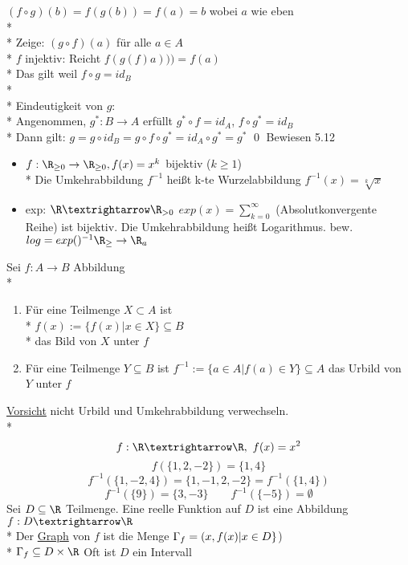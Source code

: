$(f\circ g)(b)=f(g(b))=f(a)=b$ wobei $a$ wie eben\\* \\*
%
Zeige: $(g \circ f) (a) $ für alle $a \in A$\\*
$f$ injektiv: Reicht $f(g(f)a))) = f(a)$\\*
Das gilt weil $f \circ g = id_B$ \ok \\* \\*
Eindeutigkeit von $g$:\\*
Angenommen, $g^* : B \to A$ erfüllt $g^* \circ f = id_A$,
$f \circ g^* = id_B$ \\*
%
Dann gilt: $g=g\circ id_B=g\circ f\circ g^*=id_A\circ g^* = g^*$ \qed
\bsp
Bewiesen 5.12
\begin{itemize}
\item{$f: \R_{\geq 0} \to \R_{\geq 0}, f(x) = x^k$ bijektiv ($k \geq 1$)\\*
Die Umkehrabbildung $f^{-1}$ heißt k-te Wurzelabbildung $f^{-1}(x) = \sqrt[k]{x}$ }
%
\item{exp: $\R→\R_{>0}$ $exp(x) = \sum_{k=0}^{\infty}$ (Absolutkonvergente Reihe) ist bijektiv. Die Umkehrabbildung heißt Logarithmus. bew.
$log = exp()^{-1} \R_{\geq } \to \R_a$ }
\end{itemize}
%
Sei $f:A→B$ Abbildung\\*
\begin{enumerate}
\item{Für eine Teilmenge $X \subset A$ ist \\*
$f(x) := \{f(x) | x \in X\} \subseteq B$ \\*
das Bild von $X$ unter $f$}
\item{Für eine Teilmenge $Y \subseteq B$ ist $f^{-1}:=\{a\in A|f(a)\in Y\}\subseteq A$ das Urbild von $Y$ unter $f$}
\end{enumerate}
\ul{Vorsicht} nicht Urbild und Umkehrabbildung verwechseln.\\*
\bsp
$$f:\R→\R,\ f(x)=x^2$$
$$f(\{1, 2, -2\}) = \{1, 4\}$$
$$f^{-1}(\{1,-2,4\})=\{1,-1,2,-2\}=f^{-1}(\{1,4\})$$
$$f^{-1}(\{9\})=\{3,-3\}\qquad f^{-1}(\{-5\})=\emptyset$$
%
Sei $D\subseteq\R$ Teilmenge. Eine reelle Funktion auf $D$ ist eine Abbildung $f:D→\R$\\*
%
Der \ul{Graph} von $f$ ist die Menge $\Gamma_f = \/(x, f(x) | x \in D \}$) \\*
$ \Gamma_f \subseteq D \times \R$ 
%
\bem Oft ist $D$ ein Intervall
%

